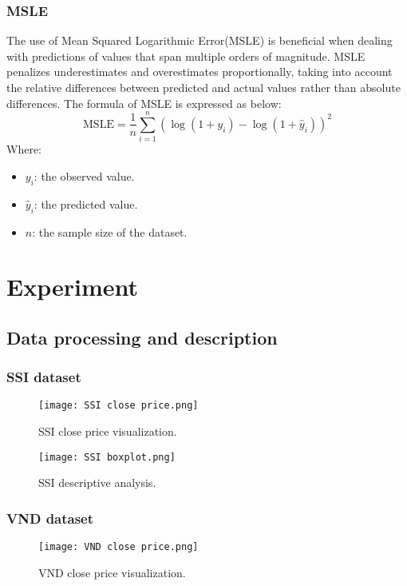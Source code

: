 \documentclass{ieeeojies}
\begin{document}
\subsubsection{MSLE}
The use of Mean Squared Logarithmic Error(MSLE) is beneficial when dealing with predictions of values that span multiple orders of magnitude. MSLE penalizes underestimates and overestimates proportionally, taking into account the relative differences between predicted and actual values rather than absolute differences. The formula of MSLE is expressed as below:
\[\text{MSLE} = \frac{1}{n} \sum_{i=1}^{n} (\log(1 + y_i) - \log(1 + \hat{y}_i))^2
\]
Where:
\begin{itemize}
    \item $y_i$: the observed value.
    \item $\hat{y}_i$: the predicted value.
    \item $n$: the sample size of the dataset.
\end{itemize}


\section{Experiment}
\subsection{Data processing and description}

\subsubsection{SSI dataset}
\begin{figure}[H]
	\centering
	\texttt{[image: SSI close price.png]}
	\caption{SSI close price visualization.\centering}
	\label{fig1}
\end{figure}

\begin{figure}[H]
	\centering
	\texttt{[image: SSI boxplot.png]}
	\caption{SSI descriptive analysis.\centering}
	\label{fig1}
\end{figure}

\subsubsection{VND dataset}
\begin{figure}[H]
	\centering
	\texttt{[image: VND  close price.png]}
	\caption{VND close price visualization.\centering}
	\label{fig1}
\end{figure}
\end{document}
